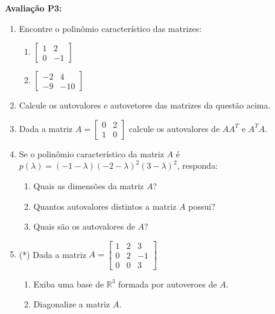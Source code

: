 \documentclass{article}
\begin{document}
{\bf Avalia\c{c}\~ao P3:}
\begin{enumerate}
\item Encontre o polin\^omio caracter\'istico das matrizes:
	\begin{enumerate}
		\item $\left[\begin{array}{cc}
					1 & 2 \\
					0 & -1
			\end{array}\right]$
		\item $\left[\begin{array}{cc}
					-2 & 4 \\
					-9 & -10
			\end{array}\right]$
	\end{enumerate}

\item Calcule os autovalores e autovetores das matrizes da quest\~ao acima.

\item Dada a matriz
	$A=\left[
		\begin{array}{cc}
			0 & 2 \\
			1 & 0
		\end{array}
	\right]$
	calcule os autovalores de $AA^T$ e $A^TA$.

\item Se o polin\^omio caracter\'istico da matriz $A$ \'e $p(\lambda) = (-1-\lambda)(-2-\lambda)^2(3-\lambda)^2$, responda:
	\begin{enumerate}
		\item Quais as dimens\~oes da matriz $A$?
		\item Quantos autovalores distintos a matriz $A$ possui?
		\item Quais s\~ao os autovalores de $A$?
	\end{enumerate}

\item (*) Dada a matriz
	$A=\left[\begin{array}{ccc}
			1 & 2 & 3 \\
			0 & 2 & -1 \\
			0 & 0 & 3
		\end{array}\right]$
	\begin{enumerate}
		\item Exiba uma base de $\mathbb{R}^3$ formada por autoveroes de $A$.
		\item Diagonalize a matriz $A$.
	\end{enumerate}
\end{enumerate}
\end{document}
